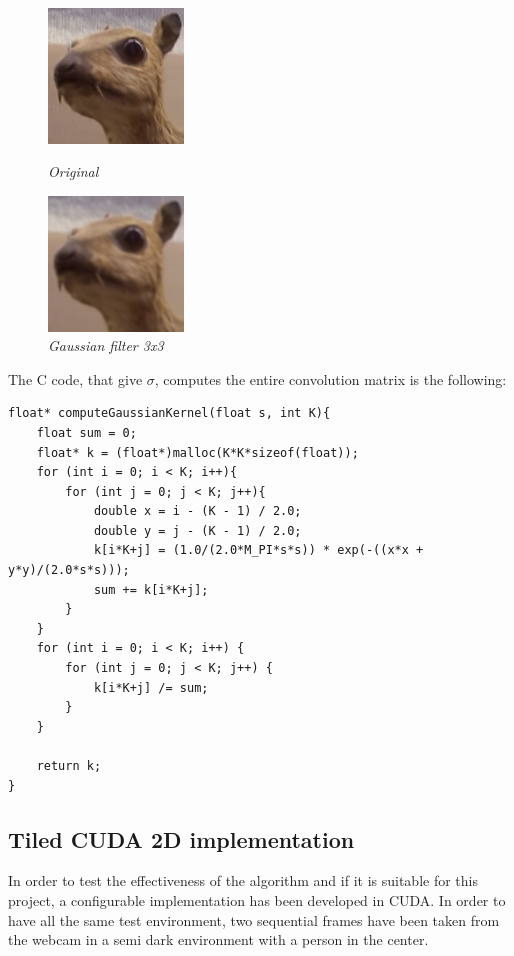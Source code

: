 \documentclass[paper=a4, fontsize=10pt]{scrartcl}	%
\begin{document}
		\begin{figure}[H]
		\centering
		\begin{minipage}[b]{0.45\textwidth}
			\centering
			\includegraphics[width=0.32\textwidth]{images/heatmap/scoiattolo1.png}
			\caption{\textit{Original}}
		\end{minipage}
		\hfill
		\begin{minipage}[b]{0.45\textwidth}
			\centering
			\includegraphics[width=0.32\textwidth]{images/heatmap/scoiattolo1_gaussian.png}
			\caption{\textit{Gaussian filter 3x3}}
		\end{minipage}
	\end{figure}

	The C code, that give $\sigma$, computes the entire convolution matrix is the following:
\begin{lstlisting}[style=CStyle]
float* computeGaussianKernel(float s, int K){
	float sum = 0;
	float* k = (float*)malloc(K*K*sizeof(float));
	for (int i = 0; i < K; i++){
		for (int j = 0; j < K; j++){
			double x = i - (K - 1) / 2.0;
			double y = j - (K - 1) / 2.0;
			k[i*K+j] = (1.0/(2.0*M_PI*s*s)) * exp(-((x*x + y*y)/(2.0*s*s)));
			sum += k[i*K+j];
		}
	}
	for (int i = 0; i < K; i++) {
		for (int j = 0; j < K; j++) {
			k[i*K+j] /= sum;
		}
	}
	
	return k;
}\end{lstlisting}	

	\subsection{Tiled CUDA 2D implementation}
	In order to test the effectiveness of the algorithm and if it is suitable for this project, a configurable implementation has been developed in CUDA. In order to have all the same test environment, two sequential frames have been taken from the webcam in a semi dark environment with a person in the center. 
	
\end{document}
